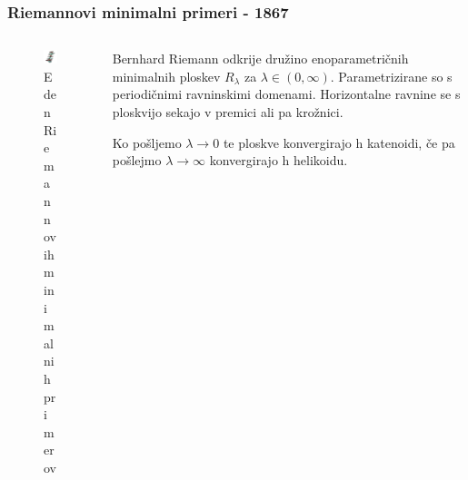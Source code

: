 \documentclass[8pt]{beamer}
\theoremstyle{definition}
\theoremstyle{remark}
\theoremstyle{plain}
\numberwithin{equation}{section}  %
\begin{document}
\begin{frame}
    \frametitle{Riemannovi minimalni primeri - 1867}

    \begin{columns}
        \begin{column}{0.4\textwidth}
            \centering
            \begin{figure}
                \includegraphics[width=16em]{../Slike/Riemann_Minimal_Example.png}
                \caption{Eden Riemannovih minimalnih primerov}
            \end{figure}
        \end{column}

        \begin{column}{0.6\textwidth}
            Bernhard Riemann odkrije družino enoparametričnih minimalnih ploskev $R_\lambda$ za $\lambda \in (0, \infty)$. Parametrizirane so s periodičnimi ravninskimi domenami. Horizontalne ravnine se s ploskvijo sekajo v premici ali pa krožnici. 
            \pause
            \vspace{0.8em}

            Ko pošljemo $\lambda \rightarrow 0$ te ploskve konvergirajo h katenoidi, če pa pošlejmo $\lambda \rightarrow \infty$ konvergirajo h helikoidu.         \end{column}
    \end{columns}
    
\end{frame}
\end{document}
